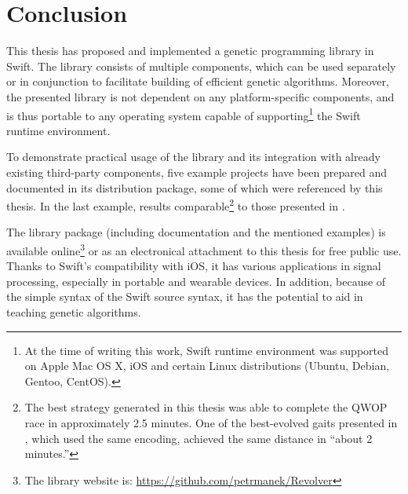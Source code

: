 \chapter{Conclusion}

This thesis has proposed and implemented a genetic programming library in Swift. The library consists of multiple components, which can be used separately or in conjunction to facilitate building of efficient genetic algorithms. Moreover, the presented library is not dependent on any platform-specific components, and is thus portable to any operating system capable of supporting\footnote{At the time of writing this work, Swift runtime environment was supported on Apple Mac OS X, iOS and certain Linux distributions (Ubuntu, Debian, Gentoo, CentOS).} the Swift runtime environment. 

To demonstrate practical usage of the library and its integration with already existing third-party components, five example projects have been prepared and documented in its distribution package, some of which were referenced by this thesis. In the last example, results comparable\footnote{The best strategy generated in this thesis was able to complete the QWOP race in approximately 2.5 minutes. One of the best-evolved gaits presented in \cite{EvolvingQwopGaits}, which used the same encoding, achieved the same distance in ``about 2 minutes.''} to those presented in \cite{EvolvingQwopGaits}.

The library package (including documentation and the mentioned examples) is available online\footnote{The library website is: \url{https://github.com/petrmanek/Revolver}} or as an electronical attachment to this thesis for free public use. Thanks to Swift's compatibility with iOS, it has various applications in signal processing, especially in portable and wearable devices. In addition, because of the simple syntax of the Swift source syntax, it has the potential to aid in teaching genetic algorithms.
